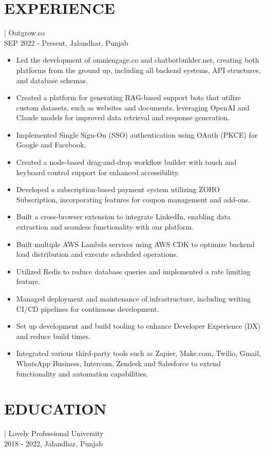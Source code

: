 \documentclass[]{resume}
\begin{document}
\section{EXPERIENCE}
 | \textrm{Outgrow.co}\\
SEP 2022 - Present, Jalandhar, Punjab
\begin{itemize}
  \item Led the development of omniengage.co and chatbotbuilder.net, creating both platforms from the ground up, including all backend systems, API structures, and database schemas.
  \item Created a platform for generating RAG-based support bots that utilize custom datasets, such as websites and documents, leveraging OpenAI and Claude models for improved data retrieval and response generation.
  \item Implemented Single Sign-On (SSO) authentication using OAuth (PKCE) for Google and Facebook.
  \item Created a node-based drag-and-drop workflow builder with touch and keyboard control support for enhanced accessibility.
  \item Developed a subscription-based payment system utilizing ZOHO Subscription, incorporating features for coupon management and add-ons.
  \item Built a cross-browser extension to integrate LinkedIn, enabling data extraction and seamless functionality with our platform.
  \item Built multiple AWS Lambda services using AWS CDK to optimize backend load distribution and execute scheduled operations.
  \item Utilized Redis to reduce database queries and implemented a rate limiting feature.
  \item Managed deployment and maintenance of infrastructure, including writing CI/CD pipelines for continuous development.
  \item Set up development and build tooling to enhance Developer Experience (DX) and reduce build times.
  \item Integrated various third-party tools such as Zapier, Make.com, Twilio, Gmail, WhatsApp Business, Intercom, Zendesk and Salesforce to extend functionality and automation capabilities.
\end{itemize}

\section{EDUCATION}
 | \textrm{Lovely Professional University}\\
2018 - 2022, Jalandhar, Punjab
\end{document}
